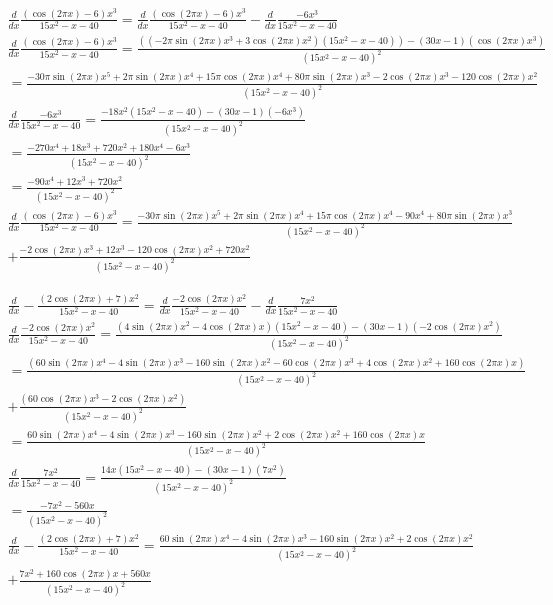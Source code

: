 \documentclass{article} %
\begin{document}
\begin{gather*}
    \frac{d}{dx} \frac{(\cos{(2\pi x)}-6)x^3}{15x^2-x-40} = \frac{d}{dx} \frac{(\cos{(2\pi x)}-6)x^3}{15x^2-x-40} - \frac{d}{dx} \frac{-6x^3}{15x^2-x-40}\\
    \frac{d}{dx} \frac{(\cos{(2\pi x)}-6)x^3}{15x^2-x-40}
    = \frac{((-2\pi \sin{(2\pi x)}x^3 + 3\cos{(2\pi x)x^2})(15x^2-x-40))-(30x-1)(\cos{(2\pi x)}x^3)}{(15x^2 -x-40)^2}\\
    = \frac{-30\pi\sin{(2\pi x)}x^5 + 2\pi\sin{(2\pi x)}x^4 + 15\pi\cos{(2\pi x)x^4} + 80\pi\sin{(2\pi x)}x^3 -2\cos{(2\pi x)}x^3 - 120\cos{(2\pi x)}x^2}{(15x^2-x-40)^2}\\
    \frac{d}{dx} \frac{-6x^3}{15x^2-x-40} = \frac{-18x^2(15x^2-x-40) - (30x-1)(-6x^3)}{(15x^2-x-40)^2}\\
    = \frac{-270x^4 + 18x^3 + 720x^2 + 180x^4 - 6x^3}{(15x^2-x-40)^2}\\
    = \frac{-90x^4 + 12x^3 + 720x^2}{(15x^2-x-40)^2}\\
    \frac{d}{dx} \frac{(\cos{(2\pi x)}-6)x^3}{15x^2-x-40} = \frac{-30\pi\sin{(2\pi x)}x^5 + 2\pi\sin{(2\pi x)}x^4 + 15\pi\cos{(2\pi x)x^4} -90x^4 + 80\pi\sin{(2\pi x)}x^3 }{(15x^2-x-40)^2}\\
    + \frac{-2\cos{(2\pi x)}x^3 +12x^3 - 120\cos{(2\pi x)}x^2 + 720x^2}{(15x^2-x-40)^2}
\end{gather*}

\begin{gather*}
    \frac{d}{dx} - \frac{(2\cos{(2\pi x)}+7)x^2}{15x^2-x-40} = \frac{d}{dx} \frac{-2\cos{(2\pi x)}x^2}{15x^2-x-40} - \frac{d}{dx} \frac{7x^2}{15x^2-x-40}\\
    \frac{d}{dx} \frac{-2\cos{(2\pi x)}x^2}{15x^2-x-40} = \frac{(4\sin{(2\pi x)}x^2 - 4\cos{(2\pi x)}x)(15x^2-x-40) - (30x-1)(-2\cos{(2\pi x)}x^2)}{(15x^2-x-40)^2}\\
    = \frac{(60\sin{(2\pi x)}x^4 -4\sin{(2\pi x)}x^3 -160\sin{(2\pi x)}x^2 - 60\cos{(2\pi x)}x^3 + 4\cos{(2\pi x)}x^2 + 160\cos{(2\pi x)}x)}{(15x^2-x-40)^2}\\
    + \frac{(60\cos{(2\pi x)}x^3 -2\cos{(2\pi x)}x^2)}{(15x^2-x-40)^2}\\
    = \frac{60\sin{(2\pi x)}x^4 - 4\sin{(2\pi x)}x^3 - 160\sin{(2\pi x)}x^2 + 2\cos{(2\pi x)}x^2 + 160\cos{(2\pi x)}x}{(15x^2-x-40)^2}\\
    \frac{d}{dx} \frac{7x^2}{15x^2-x-40} = \frac{14x(15x^2-x-40)-(30x-1)(7x^2)}{(15x^2-x-40)^2}\\
    = \frac{-7x^2-560x}{(15x^2-x-40)^2}\\
    \frac{d}{dx} - \frac{(2\cos{(2\pi x)}+7)x^2}{15x^2-x-40} = \frac{60\sin{(2\pi x)}x^4 - 4\sin{(2\pi x)}x^3 - 160\sin{(2\pi x)}x^2 + 2\cos{(2\pi x)}x^2}{(15x^2-x-40)^2}\\
    + \frac{7x^2 + 160\cos{(2\pi x)}x + 560x}{(15x^2-x-40)^2}  
\end{gather*}
\end{document}
